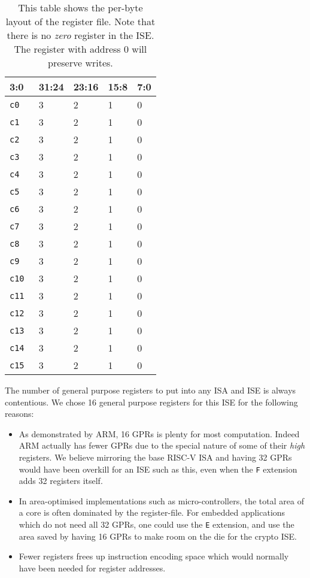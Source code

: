 \begin{table}[t]
\centering
\begin{tabular}{|l|l l l l|}
\hline
\multicolumn{1}{|l|}{3:0} & \textbf{31:24} & \textbf{23:16} & \textbf{15:8} & \textbf{7:0} \\ \hline
{\tt c0  } & 3 & 2 & 1 & 0      \\ \hline
{\tt c1  } & 3 & 2 & 1 & 0      \\ \hline
{\tt c2  } & 3 & 2 & 1 & 0      \\ \hline
{\tt c3  } & 3 & 2 & 1 & 0      \\ \hline
{\tt c4  } & 3 & 2 & 1 & 0      \\ \hline
{\tt c5  } & 3 & 2 & 1 & 0      \\ \hline
{\tt c6  } & 3 & 2 & 1 & 0      \\ \hline
{\tt c7  } & 3 & 2 & 1 & 0      \\ \hline
{\tt c8  } & 3 & 2 & 1 & 0      \\ \hline
{\tt c9  } & 3 & 2 & 1 & 0      \\ \hline
{\tt c10 } & 3 & 2 & 1 & 0      \\ \hline
{\tt c11 } & 3 & 2 & 1 & 0      \\ \hline
{\tt c12 } & 3 & 2 & 1 & 0      \\ \hline
{\tt c13 } & 3 & 2 & 1 & 0      \\ \hline
{\tt c14 } & 3 & 2 & 1 & 0      \\ \hline
{\tt c15 } & 3 & 2 & 1 & 0      \\ \hline
\end{tabular}
\caption{This table shows the per-byte layout of the register file.
Note that there is no {\em zero} register in the ISE.
The register with address $0$ will preserve writes.}
\label{tab:state-addr}
\end{table}


The number of general purpose registers to put into any ISA and ISE is
always contentious.
We chose 16 general purpose registers for this ISE for the following reasons:

\begin{itemize}
\item As demonstrated by ARM, 16 GPRs is plenty for most computation.
Indeed ARM actually has fewer GPRs due to the special nature of some of their
{\em high} registers.
We believe mirroring the base RISC-V ISA and having
32 GPRs would have been overkill for an ISE such as this, even when the
{\tt F} extension adds 32 registers itself.
\item In area-optimised implementations such as micro-controllers, the
total area of a core is often dominated by the register-file.
For embedded applications which do not need all 32 GPRs, one could use the 
{\tt E} extension, and use the area saved by having 16 GPRs to make room
on the die for the crypto ISE.
\item Fewer registers frees up instruction encoding space which would
normally have been needed for register addresses.
\end{itemize}

